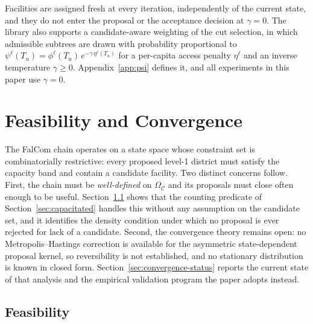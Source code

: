 \documentclass[preprint,12pt,authoryear]{elsarticle}
\theoremstyle{definition}
\begin{document}
Facilities are assigned fresh at every iteration, independently of the current state, and they do not enter the proposal or the acceptance decision at $\gamma = 0$. The library also supports a candidate-aware weighting of the cut selection, in which admissible subtrees are drawn with probability proportional to $\psi^{\ell}(T_u) = \phi^{\ell}(T_u)\,e^{-\gamma\,\eta^{\ell}(T_u)}$ for a per-capita access penalty $\eta^{\ell}$ and an inverse temperature $\gamma \geq 0$. Appendix~\ref{app:psi} defines it, and all experiments in this paper use $\gamma = 0$.

\section{Feasibility and Convergence}
\label{sec:convergence}

The FalCom chain operates on a state space whose constraint set is
combinatorially restrictive: every proposed level-1 district must satisfy
the capacity band and contain a candidate facility. Two distinct concerns
follow. First, the chain must be \emph{well-defined} on $\Omega_{\mathcal{C}}$ and its proposals must close often enough to be useful. Section~\ref{sec:feasibility} shows that the counting predicate of Section~\ref{sec:capacitated} handles this without any assumption on the candidate set, and it identifies the density condition under which no proposal is ever rejected for lack of a candidate. Second, the
convergence theory remains open: no Metropolis--Hastings correction is available for the asymmetric state-dependent proposal kernel, so reversibility is not established, and no stationary distribution is known in closed form. Section~\ref{sec:convergence-status}
reports the current state of that analysis and the empirical validation
program the paper adopts instead.

\subsection{Feasibility}
\label{sec:feasibility}
\end{document}

